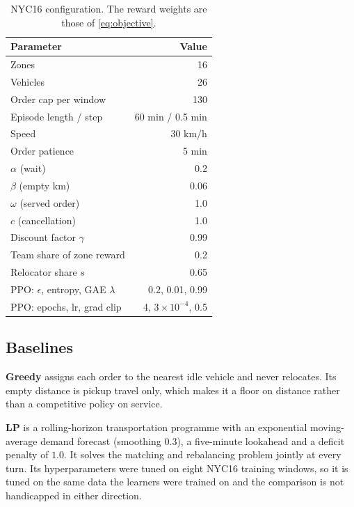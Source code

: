 \documentclass[conference]{IEEEtran}
\begin{document}
\begin{table}[!t]
\centering
\caption{NYC16 configuration. The reward weights are those of
\eqref{eq:objective}.}
\label{tab:params}
\footnotesize
\begin{tabular}{lr}
\toprule
Parameter & Value \\
\midrule
Zones                          & 16 \\
Vehicles                       & 26 \\
Order cap per window           & 130 \\
Episode length / step          & 60 min / 0.5 min \\
Speed                          & 30 km/h \\
Order patience                 & 5 min \\
$\alpha$ (wait)                & 0.2 \\
$\beta$ (empty km)             & 0.06 \\
$\omega$ (served order)        & 1.0 \\
$c$ (cancellation)             & 1.0 \\
Discount factor $\gamma$       & 0.99 \\
Team share of zone reward      & 0.2 \\
Relocator share $s$            & 0.65 \\
PPO: $\epsilon$, entropy, GAE $\lambda$ & 0.2, 0.01, 0.99 \\
PPO: epochs, lr, grad clip     & 4, $3\times10^{-4}$, 0.5 \\
\bottomrule
\end{tabular}
\end{table}

\subsection{Baselines}
\label{sec:baselines}

\textbf{Greedy} assigns each order to the nearest idle vehicle and never
relocates. Its empty distance is pickup travel only, which makes it a floor on
distance rather than a competitive policy on service.

\textbf{LP} is a rolling-horizon transportation programme with an exponential
moving-average demand forecast (smoothing $0.3$), a five-minute lookahead and
a deficit penalty of $1.0$. It solves the matching and rebalancing problem
jointly at every turn. Its hyperparameters were tuned on eight NYC16 training
windows, so it is tuned on the same data the learners were trained on and the
comparison is not handicapped in either direction.
\end{document}

